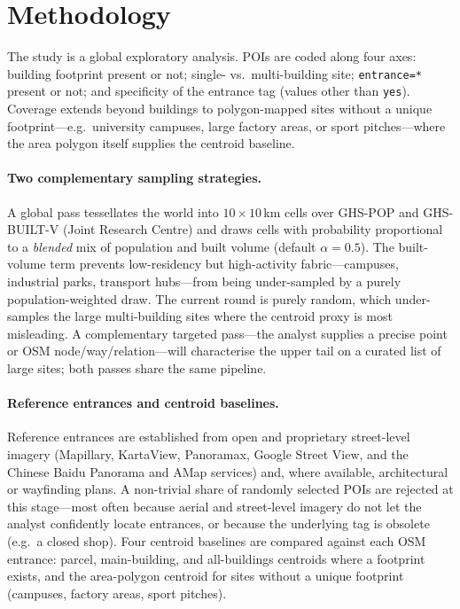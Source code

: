\documentclass{article}
\begin{document}
\section{Methodology}

The study is a global exploratory analysis. POIs are coded
along four axes: building footprint
present or not; single- vs.\ multi-building site;
\texttt{entrance=*} present or not; and specificity of the
entrance tag (values other than \texttt{yes}). Coverage extends
beyond buildings to polygon-mapped sites without a unique
footprint---e.g.\ university campuses, large factory areas, or
sport pitches---where the area polygon itself supplies the
centroid baseline.

\paragraph{Two complementary sampling strategies.} A global pass
tessellates the world into $10\times10$\,km cells over GHS-POP
and GHS-BUILT-V (Joint Research Centre) and draws cells with
probability proportional to a \emph{blended} mix of population
and built volume (default $\alpha=0.5$). The built-volume term
prevents low-residency but high-activity fabric---campuses,
industrial parks, transport hubs---from being under-sampled by a
purely population-weighted draw. The current round is purely
random, which under-samples the large multi-building sites where
the centroid proxy is most misleading. A complementary targeted
pass---the analyst supplies a precise point or OSM
node/way/relation---will characterise the upper tail on a curated
list of large sites; both passes share the same pipeline.

\paragraph{Reference entrances and centroid baselines.} Reference
entrances are established from open and proprietary street-level
imagery (Mapillary, KartaView, Panoramax, Google Street View,
and the Chinese Baidu Panorama and AMap services) and, where
available, architectural or wayfinding plans. A non-trivial share
of randomly selected POIs are rejected at this stage---most often
because aerial and street-level imagery do not let the analyst
confidently locate entrances, or because the underlying tag is
obsolete (e.g.\ a closed shop). Four centroid baselines are
compared against each OSM entrance: parcel, main-building, and
all-buildings centroids where a footprint exists, and the
area-polygon centroid for sites without a unique footprint
(campuses, factory areas, sport pitches).
\end{document}

